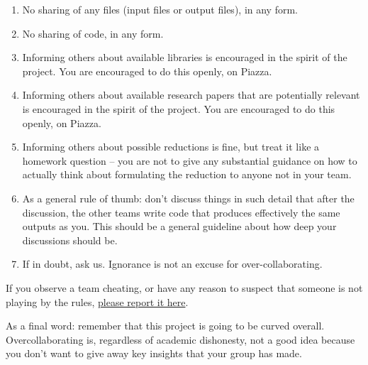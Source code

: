 \documentclass{article}
\begin{document}
\begin{enumerate}
\item No sharing of any files (input files or output files), in any form. 
\item No sharing of code, in any form.
\item Informing others about available libraries is encouraged in the spirit of the project. You are encouraged to do this openly, on Piazza.
\item Informing others about available research papers that are potentially relevant is encouraged in the spirit of the project. You are encouraged to do this openly, on Piazza.
\item Informing others about possible reductions is fine, but treat it like a homework question -- you are not to give any substantial guidance on how to actually think about formulating the reduction to anyone not in your team. 
\item As a general rule of thumb: don't discuss things in such detail that after the discussion, the other teams write code that produces effectively the same outputs as you. This should be a general guideline about how deep your discussions should be. 
\item If in doubt, ask us. Ignorance is not an excuse for over-collaborating.
\end{enumerate}


If you observe a team cheating, or have any reason to suspect that someone is not playing by the rules, \href{https://docs.google.com/forms/d/1eLI2ezQdyObNiw4-YzDq-nebAj2fvO48477chLLk9vU/edit}{please report it here}. 

As a final word: remember that this project is going to be curved overall. Overcollaborating is, regardless of academic dishonesty, not a good idea because you don't want to give away key insights that your group has made.
\end{document}
